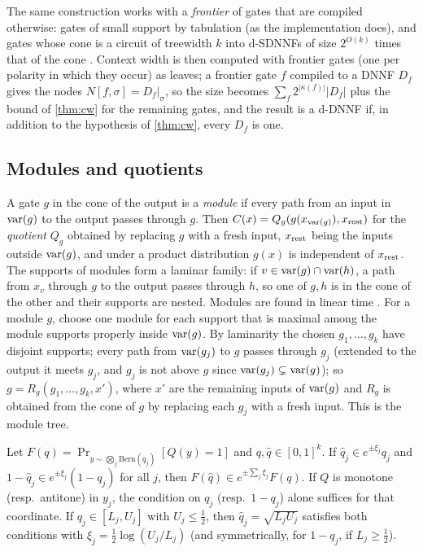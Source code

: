 The same construction works with a \emph{frontier} of gates that are compiled
otherwise: gates of small support by tabulation (as the implementation does), and
gates whose cone is a circuit of treewidth $k$ into d-SDNNFs of size $2^{O(k)}$ times
that of the cone \cite{acms2020}.
Context width is then computed with frontier gates (one per polarity in which they
occur) as leaves; a
frontier gate $f$ compiled to a DNNF $D_f$ gives the nodes $N[f,\sigma]=D_f|_\sigma$,
so the size becomes $\sum_f2^{|\kappa(f)|}|D_f|$ plus the bound of \cref{thm:cw} for
the remaining gates, and the result is a d-DNNF if, in addition to the hypothesis of
\cref{thm:cw}, every $D_f$ is one.

\subsection{Modules and quotients}\label{sec:modules-quotients}

A gate $g$ in the cone of the output is a \emph{module} if every path from an input
in $\mathrm{var}(g)$ to the output passes through $g$. Then $C(x)=Q_g(g(x_{\mathrm{var}(g)}),x_{\rm rest})$
for the \emph{quotient} $Q_g$ obtained by replacing $g$ with a fresh input, $x_{\rm
rest}$ being the inputs outside $\mathrm{var}(g)$, and under a product distribution $g(x)$ is
independent of $x_{\rm rest}$. The supports of modules form a laminar family: if
$v\in\mathrm{var}(g)\cap\mathrm{var}(h)$, a path from $x_v$ through $g$ to the output passes through
$h$, so one of $g,h$ is in the cone of the other and their supports are nested.
Modules are found in linear time \cite{dutuitrauzy1996}. For a module $g$, choose one
module for each support that is maximal among the module supports properly inside
$\mathrm{var}(g)$. By laminarity the chosen $g_1,\dots,g_k$ have disjoint supports; every path
from $\mathrm{var}(g_j)$ to $g$ passes through $g_j$ (extended to the output it meets $g_j$, and
$g_j$ is not above $g$ since $\mathrm{var}(g_j)\subsetneq\mathrm{var}(g)$); so $g=R_g(g_1,\dots,g_k,x')$,
where $x'$ are the remaining inputs of $\mathrm{var}(g)$ and $R_g$ is obtained from the cone of
$g$ by replacing each $g_j$ with a fresh input. This is the module tree.

\begin{lemma}\label{lem:quotient}
Let $F(q)=\Pr_{y\sim\bigotimes_j\mathrm{Bern}(q_j)}[Q(y)=1]$ and $q,\hat q\in[0,1]^k$.
If $\hat q_j\in e^{\pm\xi_j}q_j$ and $1-\hat q_j\in e^{\pm\xi_j}(1-q_j)$ for all $j$,
then $F(\hat q)\in e^{\pm\sum_j\xi_j}F(q)$. If $Q$ is monotone (resp.\ antitone) in
$y_j$, the condition on $q_j$ (resp.\ $1-q_j$) alone suffices for that coordinate.
If $q_j\in[L_j,U_j]$ with $U_j\le\frac12$, then $\hat q_j=\sqrt{L_jU_j}$ satisfies both
conditions with $\xi_j=\frac12\log(U_j/L_j)$ (and symmetrically, for $1-q_j$, if
$L_j\ge\frac12$).
\end{lemma}

